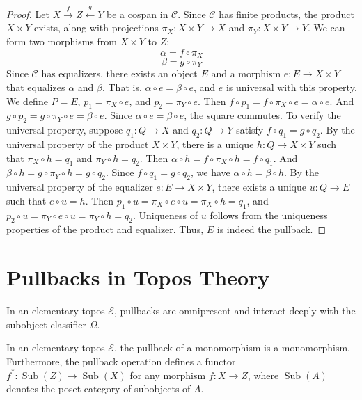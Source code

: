 \begin{proof}
Let $X \xrightarrow{f} Z \xleftarrow{g} Y$ be a cospan in $\mathcal{C}$.
Since $\mathcal{C}$ has finite products, the product $X \times Y$ exists, along with projections $\pi_X: X \times Y \to X$ and $\pi_Y: X \times Y \to Y$.
We can form two morphisms from $X \times Y$ to $Z$:
\[
\alpha = f \circ \pi_X
\]
\[
\beta = g \circ \pi_Y
\]
Since $\mathcal{C}$ has equalizers, there exists an object $E$ and a morphism $e: E \to X \times Y$ that equalizes $\alpha$ and $\beta$. That is, $\alpha \circ e = \beta \circ e$, and $e$ is universal with this property.
We define $P = E$, $p_1 = \pi_X \circ e$, and $p_2 = \pi_Y \circ e$.
Then $f \circ p_1 = f \circ \pi_X \circ e = \alpha \circ e$.
And $g \circ p_2 = g \circ \pi_Y \circ e = \beta \circ e$.
Since $\alpha \circ e = \beta \circ e$, the square commutes.
To verify the universal property, suppose $q_1: Q \to X$ and $q_2: Q \to Y$ satisfy $f \circ q_1 = g \circ q_2$.
By the universal property of the product $X \times Y$, there is a unique $h: Q \to X \times Y$ such that $\pi_X \circ h = q_1$ and $\pi_Y \circ h = q_2$.
Then $\alpha \circ h = f \circ \pi_X \circ h = f \circ q_1$.
And $\beta \circ h = g \circ \pi_Y \circ h = g \circ q_2$.
Since $f \circ q_1 = g \circ q_2$, we have $\alpha \circ h = \beta \circ h$.
By the universal property of the equalizer $e: E \to X \times Y$, there exists a unique $u: Q \to E$ such that $e \circ u = h$.
Then $p_1 \circ u = \pi_X \circ e \circ u = \pi_X \circ h = q_1$, and $p_2 \circ u = \pi_Y \circ e \circ u = \pi_Y \circ h = q_2$.
Uniqueness of $u$ follows from the uniqueness properties of the product and equalizer. Thus, $E$ is indeed the pullback.
\end{proof}

\section{Pullbacks in Topos Theory}

In an elementary topos $\mathcal{E}$, pullbacks are omnipresent and interact deeply with the subobject classifier $\Omega$.

\begin{theorem}
In an elementary topos $\mathcal{E}$, the pullback of a monomorphism is a monomorphism. Furthermore, the pullback operation defines a functor $f^*: \operatorname{Sub}(Z) \to \operatorname{Sub}(X)$ for any morphism $f: X \to Z$, where $\operatorname{Sub}(A)$ denotes the poset category of subobjects of $A$.
\end{theorem}

